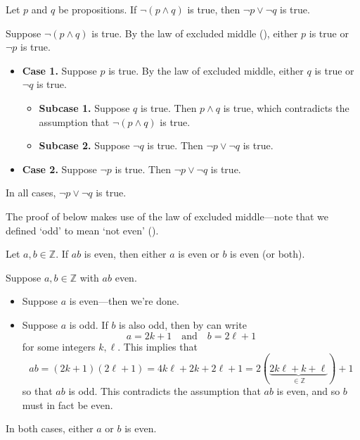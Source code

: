 \begin{example}
Let $p$ and $q$ be propositions. If $\neg(p \wedge q)$ is true, then $\neg p \vee \neg q$ is true.

Suppose $\neg(p \wedge q)$ is true. By the law of excluded middle (), either $p$ is true or $\neg p$ is true.
\begin{itemize}
  \item \textbf{Case 1.} Suppose $p$ is true. By the law of excluded middle, either $q$ is true or $\neg q$ is true.
  \begin{itemize}
    \item \textbf{Subcase 1.} Suppose $q$ is true. Then $p \wedge q$ is true, which contradicts the assumption that $\neg(p \wedge q)$ is true.
    \item \textbf{Subcase 2.} Suppose $\neg q$ is true. Then $\neg p \vee \neg q$ is true.
  \end{itemize}
  \item \textbf{Case 2.} Suppose $\neg p$ is true. Then $\neg p \vee \neg q$ is true.
\end{itemize}
In all cases, $\neg p \vee \neg q$ is true.
\end{example}




The proof of  below makes use of the law of excluded middle---note that we defined `odd' to mean `not even' ().

\begin{proposition}
\label{propIfProductEvenThenSomeFactorEven}
Let $a,b \in \mathbb{Z}$. If $ab$ is even, then either $a$ is even or $b$ is even (or both).
\end{proposition}
\begin{cproof}
Suppose $a,b \in \mathbb{Z}$ with $ab$ even.
\begin{itemize}
\item Suppose $a$ is even---then we're done.
\item Suppose $a$ is odd. If $b$ is also odd, then by  can write
\[
a = 2k+1 \quad \text{and} \quad b=2\ell+1
\]
for some integers $k,\ell$. This implies that
\[
ab = (2k+1)(2\ell+1) = 4k\ell + 2k + 2\ell + 1 = 2(\underbrace{2k\ell + k + \ell}_{\in \mathbb{Z}}) + 1
\]
so that $ab$ is odd. This contradicts the assumption that $ab$ is even, and so $b$ must in fact be even.
\end{itemize}
In both cases, either $a$ or $b$ is even.
\end{cproof}


